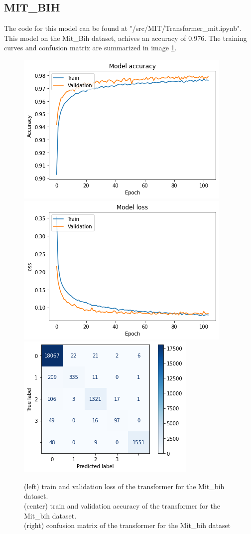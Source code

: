 \documentclass[11pt]{scrartcl}
\begin{document}
\subsection{MIT\_BIH}
The code for this model can be found at "/src/MIT/Transformer\_mit.ipynb".
This model on the Mit\_Bih dataset, achives an accuracy of 0.976. The training curves and confusion matrix are summarized in image \ref{fig:transformer_mit_three}.
\begin{figure}[htp]
\centering
\includegraphics[width=.30\textwidth]{../models_performance_graphs/mit/transformer_mit_accuracy.png}\hfill
\includegraphics[width=.30\textwidth]{../models_performance_graphs/mit/transformer_mit_loss.png}\hfill
\includegraphics[width=.30\textwidth]{../models_performance_graphs/mit/transformer_mit_confusion.png}
\caption{(left) train and validation loss of the transformer for the Mit\_bih dataset. \\ (center) train and validation accuracy of the transformer for the Mit\_bih dataset. \\(right) confusion matrix of the transformer for the Mit\_bih dataset}
\label{fig:transformer_mit_three}
\end{figure}

\end{document}

